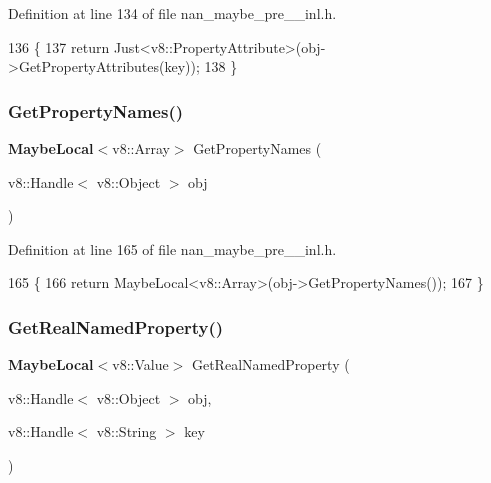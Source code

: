 Definition at line 134 of file nan\+\_\+maybe\+\_\+pre\+\_\+\_\+inl.\+h.


\begin{DoxyCode}
136                            \{
137   \textcolor{keywordflow}{return} Just<v8::PropertyAttribute>(obj->GetPropertyAttributes(key));
138 \}
\end{DoxyCode}
\mbox{\label{nan__maybe__pre__43__inl_8h_ad1997c8685b9ddb2a092091e68dfdd95}} 
\subsubsection{Get\+Property\+Names()}
{\footnotesize\ttfamily \textbf{ Maybe\+Local}$<$v8\+::\+Array$>$ Get\+Property\+Names (\begin{DoxyParamCaption}\item[{v8\+::\+Handle$<$ v8\+::\+Object $>$}]{obj }\end{DoxyParamCaption})}



Definition at line 165 of file nan\+\_\+maybe\+\_\+pre\+\_\+\_\+inl.\+h.


\begin{DoxyCode}
165                                                              \{
166   \textcolor{keywordflow}{return} MaybeLocal<v8::Array>(obj->GetPropertyNames());
167 \}
\end{DoxyCode}
\mbox{\label{nan__maybe__pre__43__inl_8h_a80c83a8f1fb40671b0be574256d4552e}} 
\subsubsection{Get\+Real\+Named\+Property()}
{\footnotesize\ttfamily \textbf{ Maybe\+Local}$<$v8\+::\+Value$>$ Get\+Real\+Named\+Property (\begin{DoxyParamCaption}\item[{v8\+::\+Handle$<$ v8\+::\+Object $>$}]{obj,  }\item[{v8\+::\+Handle$<$ v8\+::\+String $>$}]{key }\end{DoxyParamCaption})}



